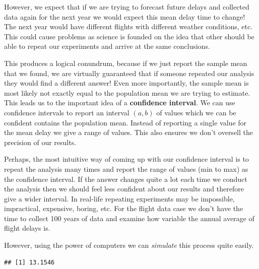 \documentclass[
]{book}
\newenvironment{Shaded}{\begin{snugshade}}{\end{snugshade}}
\newcommand{\AttributeTok}[1]{\textcolor[rgb]{0.77,0.63,0.00}{#1}}
\newcommand{\ConstantTok}[1]{\textcolor[rgb]{0.00,0.00,0.00}{#1}}
\newcommand{\DecValTok}[1]{\textcolor[rgb]{0.00,0.00,0.81}{#1}}
\newcommand{\DocumentationTok}[1]{\textcolor[rgb]{0.56,0.35,0.01}{\textbf{\textit{#1}}}}
\newcommand{\FunctionTok}[1]{\textcolor[rgb]{0.00,0.00,0.00}{#1}}
\newcommand{\NormalTok}[1]{#1}
\newcommand{\OtherTok}[1]{\textcolor[rgb]{0.56,0.35,0.01}{#1}}
\newcommand{\SpecialCharTok}[1]{\textcolor[rgb]{0.00,0.00,0.00}{#1}}
\theoremstyle{definition}
\theoremstyle{definition}
\theoremstyle{definition}
\theoremstyle{definition}
\theoremstyle{remark}
\begin{document}
However, we expect that if we are trying to forecast future delays and collected data again for the next year we would expect this mean delay time to change! The next year would have different flights with different weather conditions, etc. This could cause problems as science is founded on the idea that other should be able to repeat our experiments and arrive at the same conclusions.

This produces a logical conundrum, because if we just report the sample mean that we found, we are virtually guaranteed that if someone repeated our analysis they would find a different answer! Even more importantly, the sample mean is most likely not exactly equal to the population mean we are trying to estimate. This leads us to the important idea of a \textbf{confidence interval}. We can use confidence intervals to report an interval \((a,b)\) of values which we can be confident contains the population mean. Instead of reporting a single value for the mean delay we give a range of values. This also ensures we don't oversell the precision of our results.

Perhaps, the most intuitive way of coming up with our confidence interval is to repeat the analysis many times and report the range of values (min to max) as the confidence interval. If the answer changes quite a lot each time we conduct the analysis then we should feel less confident about our results and therefore give a wider interval. In real-life repeating experiments may be impossible, impractical, expensive, boring, etc. For the flight data case we don't have the time to collect 100 years of data and examine how variable the annual average of flight delays is.

However, using the power of computers we can \emph{simulate} this process quite easily.

\begin{Shaded}
\end{Shaded}

\begin{verbatim}
## [1] 13.1546
\end{verbatim}
\end{document}
